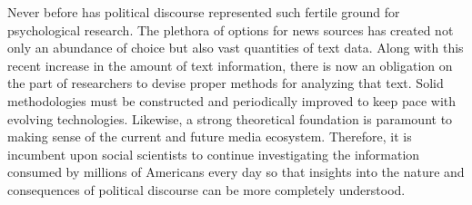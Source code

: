 \documentclass[
  english,
  man]{apa6}
\begin{document}
Never before has political discourse represented such fertile ground for psychological research. The plethora of options for news sources has created not only an abundance of choice but also vast quantities of text data. Along with this recent increase in the amount of text information, there is now an obligation on the part of researchers to devise proper methods for analyzing that text. Solid methodologies must be constructed and periodically improved to keep pace with evolving technologies. Likewise, a strong theoretical foundation is paramount to making sense of the current and future media ecosystem. Therefore, it is incumbent upon social scientists to continue investigating the information consumed by millions of Americans every day so that insights into the nature and consequences of political discourse can be more completely understood.
\end{document}
